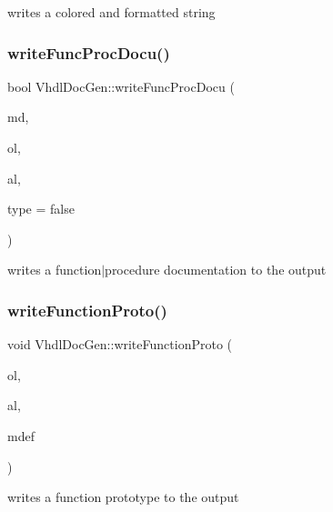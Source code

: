 writes a colored and formatted string \mbox{\label{class_vhdl_doc_gen_a8c40c856602e19b4fe421c9572d618b7}} 
\subsubsection{\texorpdfstring{writeFuncProcDocu()}{writeFuncProcDocu()}}
{\footnotesize\ttfamily bool Vhdl\+Doc\+Gen\+::write\+Func\+Proc\+Docu (\begin{DoxyParamCaption}\item[{const \mbox{\hyperlink{class_member_def}{Member\+Def}} $\ast$}]{md,  }\item[{\mbox{\hyperlink{class_output_list}{Output\+List}} \&}]{ol,  }\item[{const \mbox{\hyperlink{class_argument_list}{Argument\+List}} $\ast$}]{al,  }\item[{bool}]{type = {\ttfamily false} }\end{DoxyParamCaption})\hspace{0.3cm}{\ttfamily [static]}}

writes a function$\vert$procedure documentation to the output \mbox{\label{class_vhdl_doc_gen_ab1d66321a2c118a9376b65aeb598a49c}} 
\subsubsection{\texorpdfstring{writeFunctionProto()}{writeFunctionProto()}}
{\footnotesize\ttfamily void Vhdl\+Doc\+Gen\+::write\+Function\+Proto (\begin{DoxyParamCaption}\item[{\mbox{\hyperlink{class_output_list}{Output\+List}} \&}]{ol,  }\item[{const \mbox{\hyperlink{class_argument_list}{Argument\+List}} $\ast$}]{al,  }\item[{const \mbox{\hyperlink{class_member_def}{Member\+Def}} $\ast$}]{mdef }\end{DoxyParamCaption})\hspace{0.3cm}{\ttfamily [static]}}

writes a function prototype to the output \mbox{\label{class_vhdl_doc_gen_a67f47b8dc11d967ee47e9bda86fff7e0}} 
